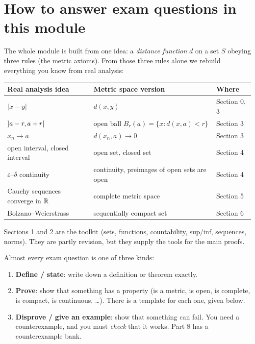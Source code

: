 \setcounter{section}{-1}
\section{How to answer exam questions in this module}

The whole module is built from one idea: a \emph{distance function} $d$ on a set $S$ obeying
three rules (the metric axioms). From those three rules alone we rebuild everything you know
from real analysis:

\begin{center}
\begin{tabular}{@{}lll@{}}
\toprule
Real analysis idea & Metric space version & Where \\ \midrule
$|x-y|$ & $d(x,y)$ & Section 0, 3 \\
$\mathopen{]}a-r,a+r\mathclose{[}$ & open ball $B_r(a)=\{x: d(x,a)<r\}$ & Section 3 \\
$x_n\to a$ & $d(x_n,a)\to 0$ & Section 3 \\
open interval, closed interval & open set, closed set & Section 4 \\
$\varepsilon$--$\delta$ continuity & continuity, preimages of open sets are open & Section 4 \\
Cauchy sequences converge in $\mathbb R$ & complete metric space & Section 5 \\
Bolzano--Weierstrass & sequentially compact set & Section 6 \\
\bottomrule
\end{tabular}
\end{center}

Sections 1 and 2 are the toolkit (sets, functions, countability, sup/inf, sequences, norms).
They are partly revision, but they supply the tools for the main proofs.

\begin{plain}
Almost every exam question is one of three kinds:
\begin{enumerate}
\item \textbf{Define / state}: write down a definition or theorem exactly.
\item \textbf{Prove}: show that something has a property (is a metric, is open, is complete,
  is compact, is continuous, \dots). There is a template for each one, given below.
\item \textbf{Disprove / give an example}: show that something can fail. You need a
  counterexample, and you must \emph{check} that it works. Part 8 has a counterexample bank.
\end{enumerate}
\end{plain}

